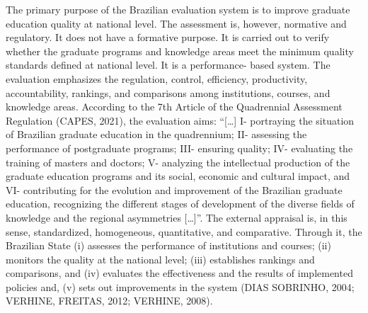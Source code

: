 The primary purpose of the Brazilian evaluation system is to improve graduate education quality at national level. The assessment is, however, normative and regulatory. It does not have a formative purpose. It is carried out to verify whether the graduate programs and knowledge areas meet the minimum quality 
standards defined at national level. It is a performance-
based system. The evaluation emphasizes the regulation, control, efficiency, productivity, accountability, rankings, and comparisons among institutions, courses, and knowledge areas. According to the 7th Article of the Quadrennial Assessment Regulation (CAPES, 2021), the evaluation aims: “[…] I- portraying the situation of Brazilian graduate education in the quadrennium; II- assessing the performance of postgraduate programs; III- ensuring quality; IV- evaluating the training of masters and doctors; V-  analyzing the intellectual production of the graduate education programs and its social, economic and cultural impact, and VI- contributing for the evolution and improvement of the Brazilian graduate education, recognizing the different stages of development of the diverse fields of knowledge and the regional asymmetries […]”. The external appraisal is, in this sense, standardized, homogeneous, quantitative, and comparative. Through it, the Brazilian State (i) assesses the performance of institutions and courses; (ii) monitors the quality at the national level; (iii) establishes rankings and comparisons, and (iv) evaluates the effectiveness and the results of implemented policies and, (v) sets out improvements in the system (DIAS SOBRINHO, 
2004; VERHINE, FREITAS, 2012; VERHINE, 2008).  


